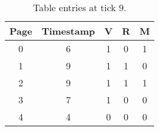 \documentclass[a4paper,11pt]{report}
\begin{document}
\begin{table}[h]
\centering
\caption{Table entries at tick $9$.}
\label{table:ex3-3}
\begin{tabular}{ccccc}
\hline
\multicolumn{1}{|c|}{\textbf{Page}} & \multicolumn{1}{c|}{\textbf{Timestamp}} & \multicolumn{1}{c|}{\textbf{V}} & \multicolumn{1}{c|}{\textbf{R}} & \multicolumn{1}{c|}{\textbf{M}} \\ \hline
0                                   & 6                                       & 1                               & 0                               & 1                               \\
1                                   & 9                                       & 1                               & 1                               & 0                               \\
2                                   & 9                                       & 1                               & 1                               & 1                               \\
3                                   & 7                                       & 1                               & 0                               & 0                               \\
4                                   & 4                                       & 0                               & 0                               & 0                              
\end{tabular}
\end{table}
\end{document}
